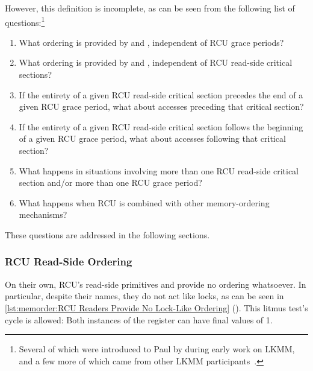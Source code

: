 However, this definition is incomplete, as can be seen from the following
list of questions:\footnote{
	Several of which were introduced to Paul by  during
	early work on LKMM, and a few more of which came from other
	LKMM participants~\cite{Alglave:2018:FSC:3173162.3177156}.}

\begin{enumerate}
\item	What ordering is provided by 
	and , independent of RCU grace periods?
\item	What ordering is provided by 
	and , independent of RCU read-side
	critical sections?
\item	If the entirety of a given RCU read-side critical section
	precedes the end of a given RCU grace period, what about
	accesses preceding that critical section?
\item	If the entirety of a given RCU read-side critical section
	follows the beginning of a given RCU grace period, what about
	accesses following that critical section?
\item	What happens in situations involving more than one RCU read-side
	critical section and/or more than one RCU grace period?
\item	What happens when RCU is combined with other memory-ordering
	mechanisms?
\end{enumerate}

These questions are addressed in the following sections.

\subsubsection{RCU Read-Side Ordering}
\label{sec:memorder:RCU Read-Side Ordering}

On their own, RCU's read-side primitives  and
 provide no ordering whatsoever.
In particular, despite their names, they do not act like locks, as can
be seen in
\cref{lst:memorder:RCU Readers Provide No Lock-Like Ordering}
().
This litmus test's cycle is allowed:
Both instances of the  register can have final values of 1.

\begin{listing}

\caption{RCU Readers Provide No Lock-Like Ordering}
\label{lst:memorder:RCU Readers Provide No Lock-Like Ordering}
\end{listing}

